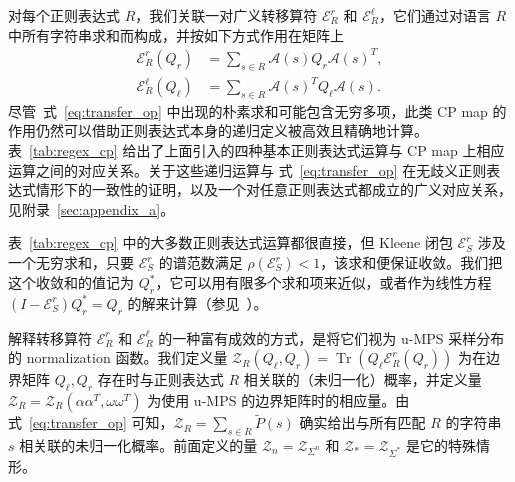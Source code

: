 \documentclass[twoside]{article}
\newcommand{\eqnref}[1]{式~\ref{#1}}
\DeclareMathOperator{\Tr}{Tr}
\newcommand{\Z}{\mc{Z}}
\newcommand{\EL}{\mc{E}^{\scriptstyle \ell}}
\newcommand{\ER}{\mc{E}^{\scriptstyle r}}
\newcommand{\QL}{Q_{\ell}}
\newcommand{\QR}{Q_{r}}
\newcommand{\Pt}{\tilde{P}}
\newcommand{\alphamat}{\alpha\alpha^T}
\newcommand{\omegamat}{\omega\omega^T}
\newcommand{\mc}[1]{\mathcal{#1}}
\begin{document}
对每个正则表达式 $R$，我们关联一对广义转移算符 $\ER_{R}$ 和 $\EL_{R}$，它们通过对语言 $R$ 中所有字符串求和而构成，并按如下方式作用在矩阵上
%
\begin{align}
\label{eq:transfer_op}
\ER_R(\QR) &= \sum_{s\in R} \mc{A}(s) \QR \mc{A}(s)^T, \nonumber\\
\EL_R(\QL) &= \sum_{s\in R} \mc{A}(s)^T \QL \mc{A}(s).
\end{align}
%
尽管~\eqnref{eq:transfer_op} 中出现的朴素求和可能包含无穷多项，此类 CP map 的作用仍然可以借助正则表达式本身的递归定义被高效且精确地计算。表~\ref{tab:regex_cp} 给出了上面引入的四种基本正则表达式运算与 CP map 上相应运算之间的对应关系。关于这些递归运算与 \eqnref{eq:transfer_op} 在无歧义正则表达式情形下的一致性的证明，以及一个对任意正则表达式都成立的广义对应关系，见附录~\ref{sec:appendix_a}。

表~\ref{tab:regex_cp} 中的大多数正则表达式运算都很直接，但 Kleene 闭包 $\ER_S$ 涉及一个无穷求和，只要 $\ER_S$ 的谱范数满足 $\rho(\ER_S) < 1$，该求和便保证收敛。我们把这个收敛和的值记为 $\QR^*$，它可以用有限多个求和项来近似，或者作为线性方程 $(I - \ER_S)\QR^* = \QR$ 的解来计算（参见~\citep{balle2019}）。

解释转移算符 $\ER_R$ 和 $\EL_R$ 的一种富有成效的方式，是将它们视为 u-MPS 采样分布的 normalization 函数。我们定义量 $\Z_R(\QL, \QR) = \Tr(\QL \ER_R(\QR))$ 为在边界矩阵 $\QL, \QR$ 存在时与正则表达式 $R$ 相关联的（未归一化）概率，并定义量 $\Z_R = \Z_R(\alphamat, \omegamat)$ 为使用 u-MPS 的边界矩阵时的相应量。由 \eqnref{eq:transfer_op} 可知，$\Z_R = \sum_{s \in R}\Pt(s)$ 确实给出与所有匹配 $R$ 的字符串 $s$ 相关联的未归一化概率。前面定义的量 $\Z_n = \Z_{\Sigma^n}$ 和 $\Z_* = \Z_{\Sigma^*}$ 是它的特殊情形。
\end{document}
